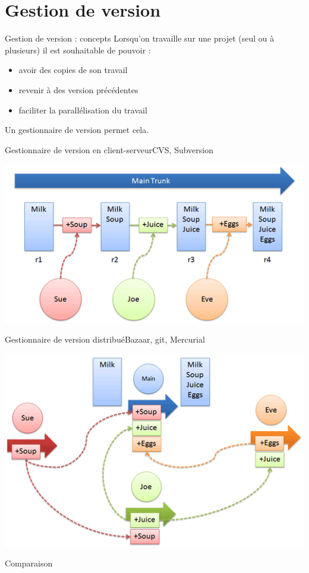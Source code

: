 \section{Gestion de version}

\begin{frame}{Gestion de version : concepts}
Lorsqu'on travaille sur une projet (seul ou à plusieurs) il est souhaitable de pouvoir :
\begin{itemize}
\item avoir des copies de son travail
\item revenir à des version précédentes
\item faciliter la parallélisation du travail
\end{itemize}

Un gestionnaire de version permet cela.
\end{frame}

\begin{frame}{Gestionnaire de version  en client-serveur}{CVS, Subversion}
\begin{center}\includegraphics[scale=0.6]{centralized_example.png}\end{center}
\end{frame}

\begin{frame}{Gestionnaire de version distribué}{Bazaar, git, Mercurial}
\begin{center}\includegraphics[scale=0.6]{distributed_example.png}\end{center}
\end{frame}

\begin{frame}{Comparaison}
\end{frame}


